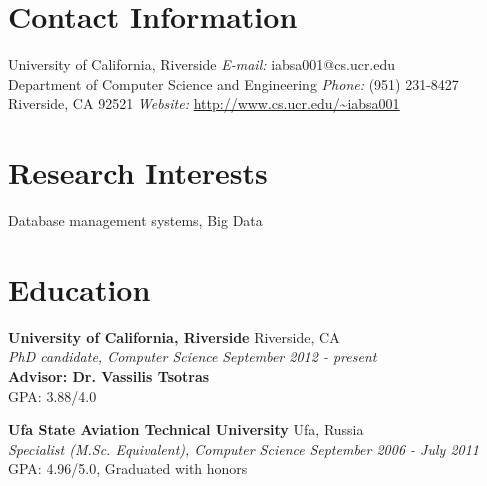 \documentclass[margin,line]{res}
\begin{document}

\begin{resume}
\section{\sc Contact Information}
University of California, Riverside \hfill				{\it E-mail:}  iabsa001@cs.ucr.edu\\      
Department of Computer Science and Engineering \hfill	{\it Phone:}    (951) 231-8427 \\
Riverside, CA 92521	\hfill								{\it Website:} \url{http://www.cs.ucr.edu/~iabsa001} \\


\section{\sc Research Interests}
Database management systems, Big Data

\section{\sc Education}
{\bf University of California, Riverside} \hfill {Riverside, CA}\\
{\em PhD candidate, Computer Science} \hfill {\it September 2012 - present}\\
{\bf Advisor: Dr. Vassilis Tsotras} \\
{GPA: 3.88/4.0}

{\bf Ufa State Aviation Technical University} \hfill { Ufa, Russia }\\
{\em Specialist (M.Sc. Equivalent), Computer Science} \hfill {\it September 2006 - July 2011}\\
{GPA: 4.96/5.0, Graduated with honors}


\end{resume}
\end{document}

